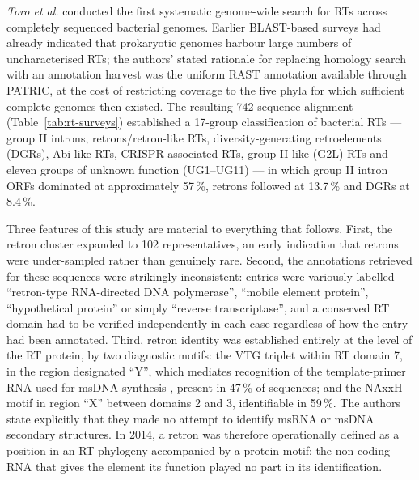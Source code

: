\textit{Toro et al.} \cite{toro2014} conducted the first systematic genome-wide search for RTs across completely
sequenced bacterial genomes. Earlier BLAST-based surveys \cite{kojima2008, simon2008} had
already indicated that prokaryotic genomes harbour large numbers of uncharacterised RTs; the
authors' stated rationale for replacing homology search with an annotation harvest was the
uniform RAST annotation available through PATRIC, at the cost of restricting coverage to the
five phyla for which sufficient complete genomes then existed. The resulting 742-sequence
alignment (Table~\ref{tab:rt-surveys}) established a 17-group classification of bacterial RTs
--- group II introns, retrons/retron-like RTs, diversity-generating retroelements (DGRs),
Abi-like RTs, CRISPR-associated RTs, group II-like (G2L) RTs and eleven groups of unknown
function (UG1--UG11) --- in which group II intron ORFs dominated at approximately 57\,\%,
retrons followed at 13.7\,\% and DGRs at 8.4\,\%.

Three features of this study are material to everything that follows. First, the retron cluster
expanded to 102 representatives, an early indication that retrons were under-sampled rather than
genuinely rare.
Second, the annotations retrieved for these sequences were strikingly inconsistent: entries were
variously labelled ``retron-type RNA-directed DNA polymerase'', ``mobile element protein'',
``hypothetical protein'' or simply ``reverse transcriptase'', and a conserved RT domain had to be
verified independently in each case regardless of how the entry had been annotated. Third, retron
identity was established entirely at the level of the RT protein, by two diagnostic motifs: the
VTG triplet within RT domain 7, in the region designated ``Y'', which mediates recognition of the
template-primer RNA used for msDNA synthesis \cite{inouye1999}, present in 47\,\% of sequences;
and the NAxxH motif in region ``X'' between domains 2 and 3, identifiable in 59\,\%. The authors
state explicitly that they made no attempt to identify msRNA or msDNA secondary structures. In
2014, a retron was therefore operationally defined as a position in an RT phylogeny accompanied by
a protein motif; the non-coding RNA that gives the element its function played no part in its
identification.
\\


